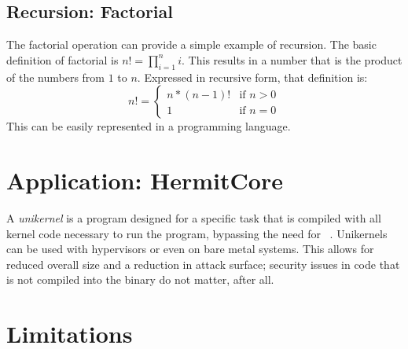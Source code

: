 \subsection{Recursion: Factorial}
The factorial operation can provide a simple example of recursion.
The basic definition of factorial is $n!=\prod_{i=1}^n i$.%
This results in a number that is the product of the numbers from $1$ to $n$.
Expressed in recursive form, that definition is:
\begin{equation}
  n!=\begin{cases}
    n * (n - 1)! & \text{if }n > 0 \\
    1 & \text{if }n = 0
  \end{cases}
\end{equation}
This can be easily represented in a programming language. %

\section{Application: HermitCore}\label{se:cfg_application}
A \emph{unikernel} is a program designed for a specific task
that is compiled with all kernel code necessary to run the program,
bypassing the need for ~\citep{madhavapeddy2014unikernels}.
Unikernels can be used with hypervisors or even on bare metal systems.
This allows for reduced overall size and a reduction in attack surface;
security issues in code that is not compiled into the binary do not matter, after all.

\section{Limitations}
